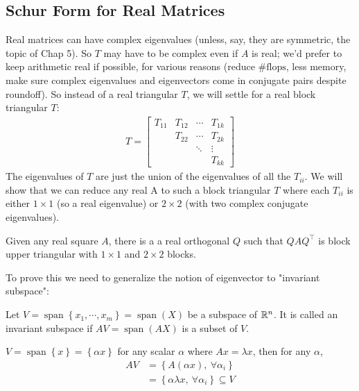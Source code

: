\documentclass[11pt]{article}
\numberwithin{equation}{section}
\begin{document}
\subsection{Schur Form for Real Matrices}
Real matrices can have complex eigenvalues (unless, say, they are symmetric, the topic of Chap 5). So $T$ may have to be complex even if $A$ is real; 
we'd prefer to keep arithmetic real if possible, for various reasons (reduce $\#\mathrm{flops}$, less memory, 
make sure complex eigenvalues and eigenvectors come in conjugate pairs despite roundoff). So instead of a real triangular $T$, we will settle for a real block triangular $T$:
\begin{align*}
    T=\left[\begin{array}{llll}
        T_{11} & T_{12} & \cdots & T_{1 k} \\
        & T_{22} & \cdots & T_{2 k} \\
        & & \ddots & \vdots \\
        & & & T_{k k}
        \end{array}\right]
\end{align*}
The eigenvalues of $T$ are just the union of the eigenvalues of all the $T_{ii}$.
We will show that we can reduce any real A to such a block triangular $T$ where each $T_{ii}$
is either $1\times 1$ (so a real eigenvalue) or $2\times 2$ (with two complex conjugate eigenvalues).

\begin{theorem}
    Given any real square $A$, there is a a real orthogonal $Q$ such that $QAQ^\top$ is block upper triangular with $1\times 1$ and $2\times 2$ blocks.
\end{theorem}

To prove this we need to generalize the notion of eigenvector to "invariant subspace":

\begin{definition}
    Let $V = \operatorname{span}\left\{ x_1, \cdots, x_m \right\} = \operatorname{span}(X)$ be a subspace of $\mathbb R^n$. It is called an invariant subspace if $AV = \operatorname{span}(AX)$ is a subset of $V$.
\end{definition}

\begin{example}
    $V =  \operatorname{span}\left\{ x \right\} = \left\{ \alpha x \right\}$ for any scalar $\alpha$ where $Ax = \lambda x$, 
    then  for any $\alpha$, \begin{align*}
        AV &= \left\{ A(\alpha x),\ \forall \alpha_i  \right\} \\
        &= \left\{ \alpha \lambda x, \ \forall \alpha_i  \right\} \subseteq V
    \end{align*}
\end{example}
\end{document}
